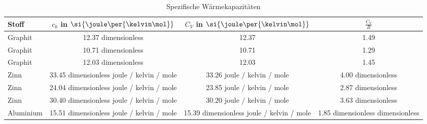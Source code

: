 \begin{table} 
 \centering 
 \begin{tabular}{lS S S } 
 \toprule  
 {Stoff} & {{$c_k$ in $\si{\joule \per {\kelvin \mol}}$}} & {{$C_V$ in $\si{\joule \per {\kelvin \mol}}$}}  &  {$\frac{C_V}{R}$}  \\ 
\midrule  
 {Graphit} & 12.37 dimensionless & 12.37 & 1.49  \\ 
{Graphit} & 10.71 dimensionless & 10.71 & 1.29  \\ 
{Graphit} & 12.03 dimensionless & 12.03 & 1.45  \\ 
{Zinn} & 33.45 dimensionless joule / kelvin / mole & 33.26 joule / kelvin / mole & 4.00 dimensionless  \\ 
{Zinn} & 24.04 dimensionless joule / kelvin / mole & 23.85 joule / kelvin / mole & 2.87 dimensionless  \\ 
{Zinn} & 30.40 dimensionless joule / kelvin / mole & 30.20 joule / kelvin / mole & 3.63 dimensionless  \\ 
{Aluminium} & 15.51 dimensionless joule / kelvin / mole & 15.39 dimensionless joule / kelvin / mole & 1.85 dimensionless dimensionless  \\ 
\bottomrule 
 \end{tabular} 
 \caption{Spezifische Wärmekapazitäten} 
 \label{tab: c_v} 
  \end{table}